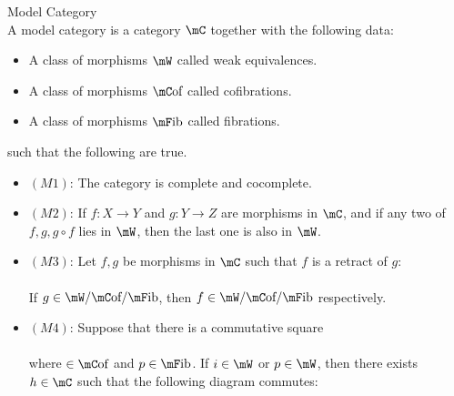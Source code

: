 \documentclass[a4paper]{article}
\begin{document}
\begin{defn}{Model Category}{}\\
A model category is a category $\mC$ together with the following data: 
\begin{itemize}
\item A class of morphisms $\mW$ called weak equivalences. 
\item A class of morphisms $\mC\text{of}$ called cofibrations. 
\item A class of morphisms $\mF\text{ib}$ called fibrations. 
\end{itemize}
such that the following are true. 
\begin{itemize}
\item $(M1)$: The category is complete and cocomplete. 
\item $(M2)$: If $f:X\to Y$ and $g:Y\to Z$ are morphisms in $\mC$, and if any two of $f,g,g\circ f$ lies in $\mW$, then the last one is also in $\mW$. 
\item $(M3)$: Let $f,g$ be morphisms in $\mC$ such that $f$ is a retract of $g$: \\
\\
If $g\in\mW/\mC\text{of}/\mF\text{ib}$, then $f\in\mW/\mC\text{of}/\mF\text{ib}$ respectively. 
\item $(M4)$: Suppose that there is a commutative square\\
\\
where $\in\mC\text{of}$ and $p\in\mF\text{ib}$. If $i\in\mW$ or $p\in\mW$, then there exists $h\in\mC$ such that the following diagram commutes: \\
\end{itemize}
\end{defn}
\end{document}
